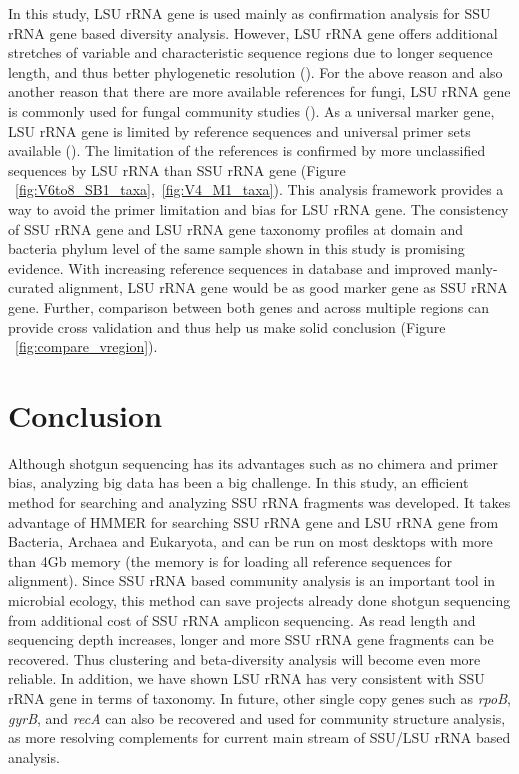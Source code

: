 \documentclass[12pt]{article}
\begin{document}
  In this study, LSU rRNA gene is used mainly as confirmation analysis for SSU rRNA gene based diversity analysis. However, LSU rRNA gene offers additional stretches of variable and characteristic sequence regions due to longer sequence length, and thus better phylogenetic resolution (\cite{lsuprimer}). For the above reason and also another reason that there are more available references for fungi, LSU rRNA gene is commonly used for fungal community studies (\cite{lsufungal2007,lsuclassifier,lsufungal2012,lsufungal2010}). As a universal marker gene, LSU rRNA gene is limited by reference sequences and universal primer sets available (\cite{lsuprimer}). The limitation of the references is confirmed by more unclassified sequences by LSU rRNA than SSU rRNA gene (Figure ~\ref{fig:V6to8_SB1_taxa},~\ref{fig:V4_M1_taxa}). This analysis framework provides a way to avoid the primer limitation and bias for LSU rRNA gene. The consistency of SSU rRNA gene and LSU rRNA gene taxonomy profiles at domain and bacteria phylum level of the same sample shown in this study is promising evidence. With increasing reference sequences in database and improved manly-curated alignment, LSU rRNA gene would be as good marker gene as SSU rRNA gene. Further, comparison between both genes and across multiple regions can provide cross validation and thus help us make solid conclusion (Figure ~\ref{fig:compare_vregion}).

\section{Conclusion}
Although shotgun sequencing has its advantages such as no chimera and primer bias, analyzing big data has been a big challenge. In this study, an efficient method for searching and analyzing SSU rRNA fragments was developed. It takes advantage of HMMER for searching SSU rRNA gene and LSU rRNA gene from Bacteria, Archaea and Eukaryota, and can be run on most desktops with more than 4Gb memory (the memory is for loading all reference sequences for alignment). Since SSU rRNA based community analysis is an important tool in microbial ecology, this method can save projects already done shotgun sequencing from additional cost of SSU rRNA amplicon sequencing. As read length and sequencing depth increases, longer and more SSU rRNA gene fragments can be recovered. Thus clustering and beta-diversity analysis will become even more reliable. In addition, we have shown LSU rRNA has very consistent with SSU rRNA gene in terms of taxonomy. In future, other single copy genes such as {\em rpoB}, {\em gyrB}, and {\em recA} can also be recovered and used for community structure analysis, as more resolving complements for current main stream of SSU/LSU rRNA based analysis.
\end{document}
